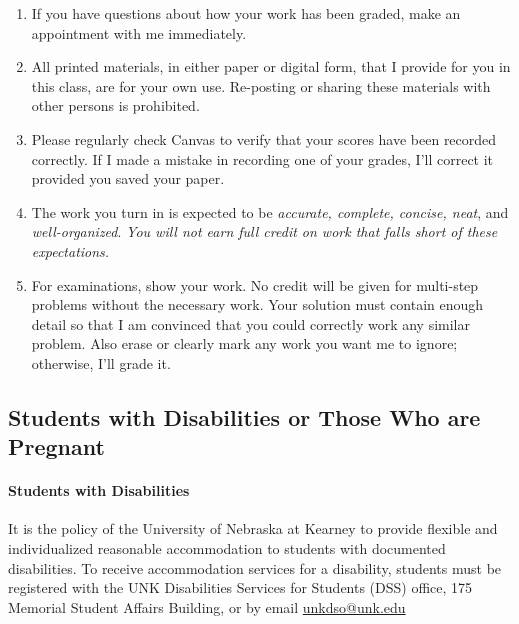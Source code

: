 \documentclass[12pt]{article}
\newcounter{ex}\setcounter{ex}{0}
\begin{document}
\begin{enumerate}
 
\item If you have questions about how your work has been graded, make an appointment with me immediately.

\item All printed materials, in either paper or digital form, that I 
provide for you in this class, are for your own use. Re-posting or 
sharing these materials with other persons is prohibited. 

\item Please regularly check Canvas  to verify that your scores have 
been recorded correctly.  If I made a mistake in recording one of
your grades, I'll correct it provided you saved your paper.

\item The work you turn in is expected to be \emph{accurate, 
complete, concise, neat}, and \emph{well-organized}.  
\emph{You will not earn full credit on work that falls short of 
these expectations.}

\item For examinations, show your work.  No credit will be given for multi-step problems without the necessary work. Your solution must contain enough detail
so that I am convinced that you could correctly work any similar problem. Also erase or clearly mark any work you want me to ignore; otherwise,
I'll grade it.  

\end{enumerate}


\subsection*{Students with Disabilities or Those Who are Pregnant}

\paragraph{Students with Disabilities} It is the policy of the University of Nebraska 
at Kearney to provide flexible and individualized reasonable 
accommodation to students with documented disabilities. To receive 
accommodation services for a disability, students must be
registered with the UNK Disabilities Services for Students (DSS) 
office, 175 Memorial Student Affairs Building, 
 or 
by email \href{mailto:unkdso@unk.edu}{unkdso@unk.edu}
\end{document}
